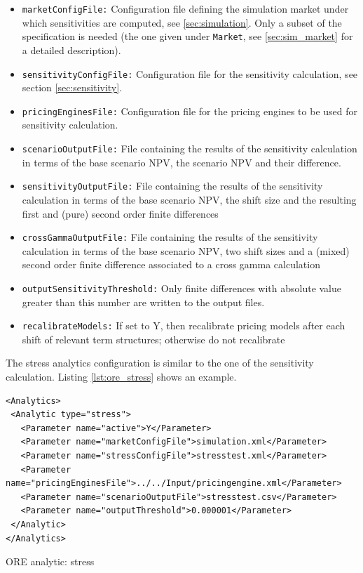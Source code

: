 \documentclass[12pt, a4paper]{article}
\begin{document}
\begin{itemize}
\item {\tt marketConfigFile:} Configuration file defining the simulation market under which sensitivities are computed,
  see \ref{sec:simulation}. Only a subset of the specification is needed (the one given under {\tt Market}, see
  \ref{sec:sim_market} for a detailed description).
\item {\tt sensitivityConfigFile:} Configuration file  for the sensitivity calculation, see section \ref{sec:sensitivity}.
\item {\tt pricingEnginesFile:} Configuration file for the pricing engines to be used for sensitivity calculation.
\item {\tt scenarioOutputFile:} File containing the results of the sensitivity calculation in terms of the base scenario
  NPV, the scenario NPV and their difference.
\item {\tt sensitivityOutputFile:} File containing the results of the sensitivity calculation in terms of the base scenario
  NPV, the shift size and the resulting first and (pure) second order finite differences
\item {\tt crossGammaOutputFile:} File containing the results of the sensitivity calculation in terms of the base scenario
  NPV, two shift sizes and a (mixed) second order finite difference associated to a cross gamma calculation
\item {\tt outputSensitivityThreshold:} Only finite differences with absolute value greater than this number are written
  to the output files.
\item {\tt recalibrateModels:} If set to Y, then recalibrate pricing models after each shift of relevant term structures; otherwise do not recalibrate
\end{itemize}

The stress analytics configuration is similar to the one of the sensitivity calculation. Listing \ref{lst:ore_stress}
shows an example.

\begin{listing}[H]
\begin{verbatim}
<Analytics>
 <Analytic type="stress">
   <Parameter name="active">Y</Parameter>
   <Parameter name="marketConfigFile">simulation.xml</Parameter>
   <Parameter name="stressConfigFile">stresstest.xml</Parameter>
   <Parameter name="pricingEnginesFile">../../Input/pricingengine.xml</Parameter>
   <Parameter name="scenarioOutputFile">stresstest.csv</Parameter>
   <Parameter name="outputThreshold">0.000001</Parameter>
 </Analytic>
</Analytics>
\end{verbatim}
\caption{ORE analytic: stress}
\label{lst:ore_stress}
\end{listing}
\end{document}
